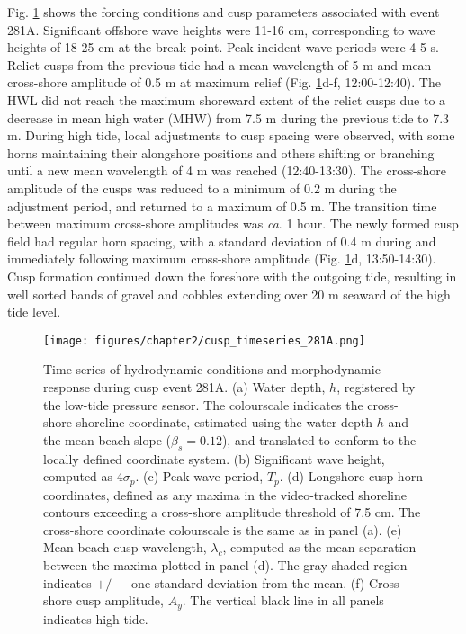Fig. \ref{fig:cusp_timeseries_281A} shows the forcing conditions and cusp parameters associated with event 281A. Significant offshore wave heights were 11-16 cm, corresponding to wave heights of 18-25 cm at the break point. Peak incident wave periods were 4-5 s. Relict cusps from the previous tide had a mean wavelength of 5 m and mean cross-shore amplitude of 0.5 m at maximum relief (Fig. \ref{fig:cusp_timeseries_281A}d-f, 12:00-12:40). The HWL did not reach the maximum shoreward extent of the relict cusps due to a decrease in mean high water (MHW) from 7.5 m during the previous tide to 7.3 m. During high tide, local adjustments to cusp spacing were observed, with some horns maintaining their alongshore positions and others shifting or branching until a new mean wavelength of 4 m was reached (12:40-13:30). The cross-shore amplitude of the cusps was reduced to a minimum of 0.2 m during the adjustment period, and returned to a maximum of 0.5 m. The transition time between maximum cross-shore amplitudes was \textit{ca}. 1 hour. The newly formed cusp field had regular horn spacing, with a standard deviation of 0.4 m during and immediately following maximum cross-shore amplitude (Fig. \ref{fig:cusp_timeseries_281A}d, 13:50-14:30). Cusp formation continued down the foreshore with the outgoing tide, resulting in well sorted bands of gravel and cobbles extending over 20 m seaward of the high tide level. 

\begin{figure}[tbp]%
 	\texttt{[image: figures/chapter2/cusp\_timeseries\_281A.png]}
	\caption[Cusp horn dynamics: yearday 281]{Time series of hydrodynamic conditions and morphodynamic response during cusp event 281A. (a) Water depth, $h$, registered by the low-tide pressure sensor. The colourscale indicates the cross-shore shoreline coordinate, estimated using the water depth $h$ and the mean beach slope ($\beta_s=0.12$), and translated to conform to the locally defined coordinate system. (b) Significant wave height, computed as $4\sigma_p$. (c) Peak wave period, $T_p$. (d) Longshore cusp horn coordinates, defined as any maxima in the video-tracked shoreline contours exceeding a cross-shore amplitude threshold of 7.5 cm. The cross-shore coordinate colourscale is the same as in panel (a). (e) Mean beach cusp wavelength, $\lambda_c$, computed as the mean separation between the maxima plotted in panel (d). The gray-shaded region indicates $+/-$ one standard deviation from the mean. (f) Cross-shore cusp amplitude, $A_y$. The vertical black line in all panels indicates high tide.} %
	\label{fig:cusp_timeseries_281A}
\end{figure}

